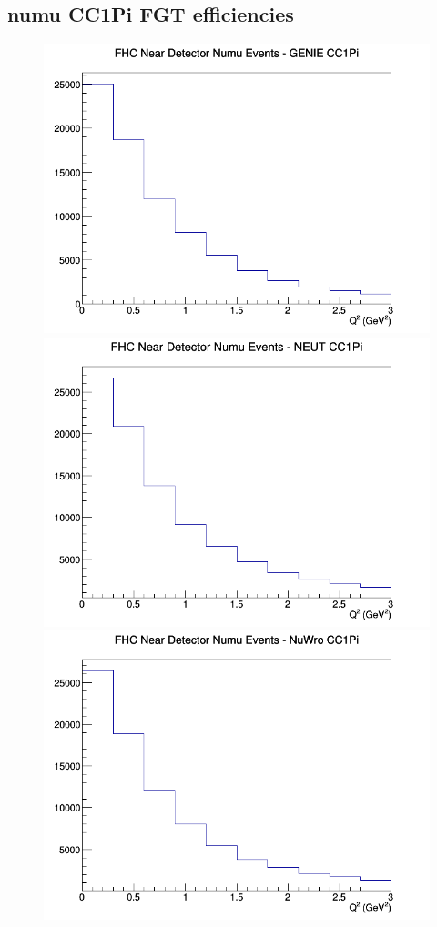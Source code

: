 \documentclass[12pt]{article}
\begin{document}
\subsection{numu CC1Pi FGT efficiencies}
\begin{figure}[h]
\includegraphics[width=\linewidth]{eff_Q2/FGT/CC1Pi_FHC_ND_numu_Q2_GENIE.png}
\endminipage
{}
\includegraphics[width=\linewidth]{eff_Q2/FGT/CC1Pi_FHC_ND_numu_Q2_NEUT.png}
\endminipage
{}
\includegraphics[width=\linewidth]{eff_Q2/FGT/CC1Pi_FHC_ND_numu_Q2_NuWro.png}

\end{figure}
\end{document}
